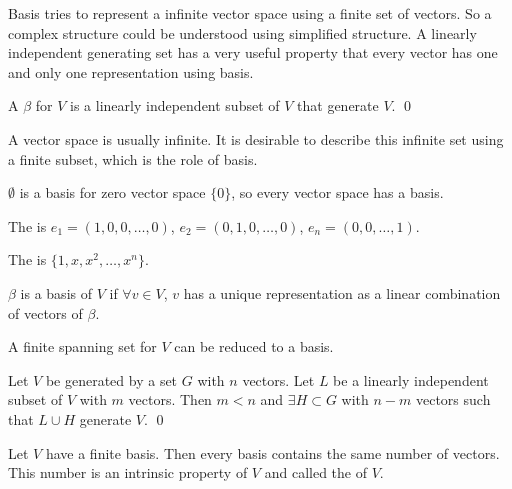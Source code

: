 Basis tries to represent a infinite vector space using a finite set of vectors. So a complex structure could be understood using simplified structure. A linearly independent generating set has a very useful property that every vector has one and only one representation using basis.

\begin{definition}
	A  $\beta$ for $V$ is a linearly independent subset of $V$ that generate $V$. 
	\qed
\end{definition}

A vector space is usually infinite. It is desirable to describe this infinite set using a finite subset, which is  the role of basis.

\begin{theorem}
    $\emptyset$ is a basis for zero vector space $\{0\}$, so every vector space has a basis.
\end{theorem}

\begin{definition}
    The  is $e_1=(1,0,0,\dots,0)$, $e_2=(0,1,0,\dots,0)$, $e_n=(0,0,\dots,1)$.
\end{definition}

\begin{definition}
    The  is $\{1,x,x^2,\dots,x^n\}$.
\end{definition}


\begin{theorem}
	$\beta$ is a basis of $V$ if $\forall v \in V $, $v$ has a unique representation as a linear combination of vectors of $\beta$.
\end{theorem}

\begin{theorem}
    A finite spanning set for $V$ can be reduced to a basis.    
\end{theorem}


\begin{theorem}
	Let $V$ be generated by a set $G$ with $n$ vectors. Let $L$ be a linearly independent subset of $V$ with $m$ vectors. Then $m < n$ and $\exists H \subset G$ with $n-m$ vectors such that $L \cup H$ generate $V$.
	\qed
\end{theorem}

\begin{theorem}
    Let $V$ have a finite basis. Then every basis contains the same number of vectors. This number is an intrinsic property of $V$ and called the  of $V$.    
\end{theorem}

